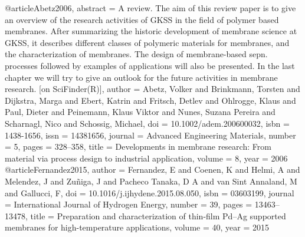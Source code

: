 @article{Abetz2006,
abstract = {A review.  The aim of this review paper is to give an overview of the research activities of GKSS in the field of polymer based membranes.  After summarizing the historic development of membrane science at GKSS, it describes different classes of polymeric materials for membranes, and the characterization of membranes.  The design of membrane-based sepn. processes followed by examples of applications will also be presented.  In the last chapter we will try to give an outlook for the future activities in membrane research. [on SciFinder(R)]},
author = {Abetz, Volker and Brinkmann, Torsten and Dijkstra, Marga and Ebert, Katrin and Fritsch, Detlev and Ohlrogge, Klaus and Paul, Dieter and Peinemann, Klaus Viktor and Nunes, Suzana Pereira and Scharnagl, Nico and Schossig, Michael},
doi = {10.1002/adem.200600032},
isbn = {1438-1656},
issn = {14381656},
journal = {Advanced Engineering Materials},
number = {5},
pages = {328--358},
title = {{Developments in membrane research: From material via process design to industrial application}},
volume = {8},
year = {2006}
}
@article{Fernandez2015,
author = {Fernandez, E and Coenen, K and Helmi, A and Melendez, J and Zu{\~{n}}iga, J and {Pacheco Tanaka}, D A and {van Sint Annaland}, M and Gallucci, F},
doi = {10.1016/j.ijhydene.2015.08.050},
isbn = {03603199},
journal = {International Journal of Hydrogen Energy},
number = {39},
pages = {13463--13478},
title = {{Preparation and characterization of thin-film Pd–Ag supported membranes for high-temperature applications}},
volume = {40},
year = {2015}
}
